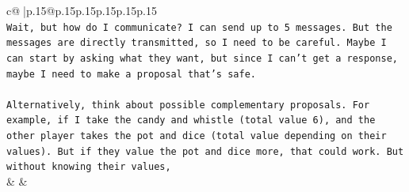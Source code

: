 \documentclass{article}
\begin{document}
{\begin{supertabular}{c@{$\;$}|p{.15\linewidth}@{}p{.15\linewidth}p{.15\linewidth}p{.15\linewidth}p{.15\linewidth}p{.15\linewidth}}
{{{\\ 
\texttt{Wait, but how do I communicate? I can send up to 5 messages. But the messages are directly transmitted, so I need to be careful. Maybe I can start by asking what they want, but since I can't get a response, maybe I need to make a proposal that's safe.} \\
\\ 
\texttt{Alternatively, think about possible complementary proposals. For example, if I take the candy and whistle (total value 6), and the other player takes the pot and dice (total value depending on their values). But if they value the pot and dice more, that could work. But without knowing their values,} \\
            }
        }
    }
    & & \\ \\


\end{supertabular}}
\end{document}

